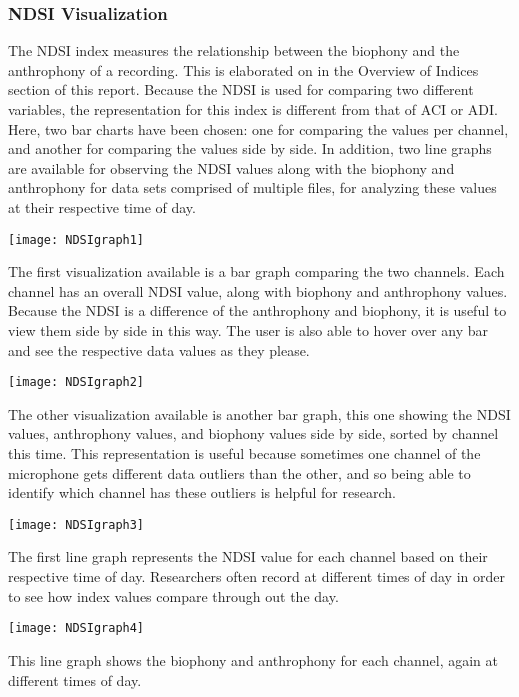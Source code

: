 \subsubsection{NDSI Visualization}
The NDSI index measures the relationship between the biophony and the anthrophony of a recording. This is elaborated on in the Overview of Indices section of this report. Because the NDSI is used for comparing two different variables, the representation for this index is different from that of ACI or ADI. Here, two bar charts have been chosen: one for comparing the values per channel, and another for comparing the values side by side. In addition, two line graphs are available for observing the NDSI values along with the biophony and anthrophony for data sets comprised of multiple files, for analyzing these values at their respective time of day.\par

\begin{center}
  \texttt{[image: NDSIgraph1]} \\[12pt]
\end{center}
The first visualization available is a bar graph comparing the two channels. Each channel has an overall NDSI value, along with biophony and anthrophony values. Because the NDSI is a difference of the anthrophony and biophony, it is useful to view them side by side in this way. The user is also able to hover over any bar and see the respective data values as they please.\par

\begin{center}
  \texttt{[image: NDSIgraph2]} \\[12pt]
\end{center}
The other visualization available is another bar graph, this one showing the NDSI values, anthrophony values, and biophony values side by side, sorted by channel this time. This representation is useful because sometimes one channel of the microphone gets different data outliers than the other, and so being able to identify which channel has these outliers is helpful for research.\par

\begin{center}
  \texttt{[image: NDSIgraph3]} \\[12pt]
\end{center}
The first line graph represents the NDSI value for each channel based on their respective time of day. Researchers often record at different times of day in order to see how index values compare through out the day.\par

\begin{center}
  \texttt{[image: NDSIgraph4]} \\[12pt]
\end{center}
This line graph shows the biophony and anthrophony for each channel, again at different times of day.
